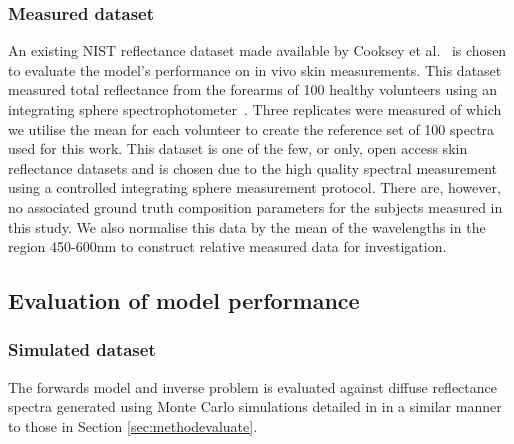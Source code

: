 \subsubsection{Measured dataset}
An existing NIST reflectance dataset made available by Cooksey et al.~\cite{Cooksey2017} is chosen to evaluate the model's performance on in vivo skin measurements. This dataset measured total reflectance from the forearms of 100 healthy volunteers using an integrating sphere spectrophotometer~\cite{Cooksey2017}. Three replicates were measured of which we utilise the mean for each volunteer to create the reference set of 100 spectra used for this work. This dataset is one of the few, or only, open access skin reflectance datasets and is chosen due to the high quality spectral measurement using a controlled integrating sphere measurement protocol. There are, however, no associated ground truth composition parameters for the subjects measured in this study. We also normalise this data by the mean of the wavelengths in the region 450-600nm to construct relative measured data for investigation. 
\FloatBarrier

\subsection{Evaluation of model performance}\label{sec:methodevaluate2}
\subsubsection{Simulated dataset}
The forwards model and inverse problem is evaluated against diffuse reflectance spectra generated using Monte Carlo simulations detailed in  in a similar manner to those in Section \ref{sec:methodevaluate}. 
%

